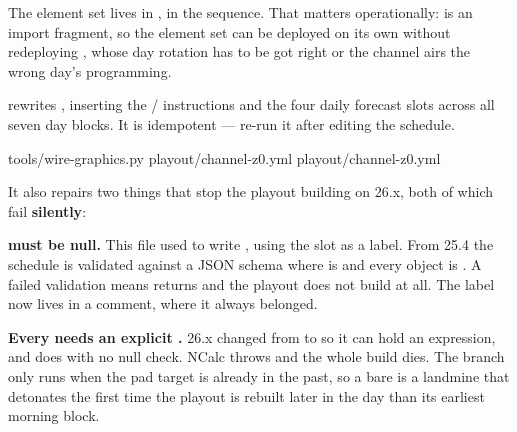 \documentclass[fontpath=fonts/,logopath=logo/]{riposte-doc}
\begin{document}

The element set lives in \textbf{}, in the  sequence. That matters operationally:  is an import fragment, so the element set can be deployed on its own without redeploying , whose day rotation has to be got right or the channel airs the wrong day's programming.

 rewrites , inserting the / instructions and the four daily forecast slots across all seven day blocks. It is idempotent — re-run it after editing the schedule.

\ripcodeopen
{}
\begin{ripcodeblock}
tools/wire-graphics.py playout/channel-z0.yml playout/channel-z0.yml
\end{ripcodeblock}
\ripcodesizereset\ripcodeclose

It also repairs two things that stop the playout building on 26.x, both of which fail \textbf{silently}:

\begin{ripbullets}
\item \textbf{ must be null.} This file used to write , using the slot as a label. From 25.4 the schedule is validated against a JSON schema where  is  and every object is . A failed validation means  returns  and the playout does not build at all. The label now lives in a comment, where it always belonged.
\item \textbf{Every  needs an explicit .} 26.x changed  from  to  so it can hold an expression, and  does  with no null check. NCalc throws  and the whole build dies. The branch only runs when the pad target is already in the past, so a bare  is a landmine that detonates the first time the playout is rebuilt later in the day than its earliest morning block.
\end{ripbullets}
\end{document}
